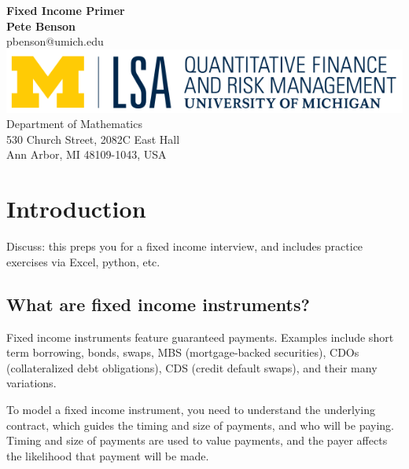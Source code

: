 \documentclass{report}
\numberwithin{problem}{chapter} %
\begin{document}
\begin{titlepage}
\begin{center}
 {\huge\bfseries Fixed Income Primer\\}
 \vspace{1.5cm}
 {\bfseries Pete Benson}\\[5pt]
 pbenson@umich.edu\\[14pt]
 \vspace{10cm}
\includegraphics{QFRM_rgb}\\[5pt]
{Department of Mathematics}\\[5pt]
{530 Church Street, 2082C East Hall}\\[5pt]
{Ann Arbor, MI 48109-1043,
 USA}\\
 \vfill

\end{center}
\end{titlepage}

\tableofcontents
\newpage

\chapter{Introduction}
Discuss: this preps you for a fixed income interview, and includes practice exercises via Excel, python, etc.

\section{What are fixed income instruments?}
Fixed income instruments feature guaranteed payments. Examples include short term borrowing, bonds, swaps, MBS (mortgage-backed securities), CDOs (collateralized debt obligations), CDS (credit default swaps), and their many variations.

To model a fixed income instrument, you need to understand the underlying contract, which guides the timing and size of payments, and who will be paying. Timing and size of payments are used to value payments, and the payer affects the likelihood that payment will be made.
\end{document}
